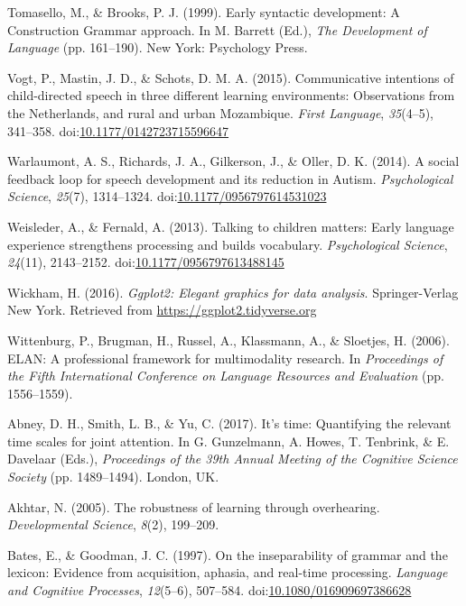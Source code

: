 \documentclass[,man,floatsintext]{apa6}
\begin{document}
\hypertarget{ref-tomasello1999early}{}
Tomasello, M., \& Brooks, P. J. (1999). Early syntactic development: A
Construction Grammar approach. In M. Barrett (Ed.), \emph{The
Development of Language} (pp. 161--190). New York: Psychology Press.

\hypertarget{ref-vogt2015communicative}{}
Vogt, P., Mastin, J. D., \& Schots, D. M. A. (2015). Communicative
intentions of child-directed speech in three different learning
environments: Observations from the Netherlands, and rural and urban
Mozambique. \emph{First Language}, \emph{35}(4--5), 341--358.
doi:\href{https://doi.org/10.1177/0142723715596647}{10.1177/0142723715596647}

\hypertarget{ref-warlaumont2014social}{}
Warlaumont, A. S., Richards, J. A., Gilkerson, J., \& Oller, D. K.
(2014). A social feedback loop for speech development and its reduction
in Autism. \emph{Psychological Science}, \emph{25}(7), 1314--1324.
doi:\href{https://doi.org/10.1177/0956797614531023}{10.1177/0956797614531023}

\hypertarget{ref-weisleder2013talking}{}
Weisleder, A., \& Fernald, A. (2013). Talking to children matters: Early
language experience strengthens processing and builds vocabulary.
\emph{Psychological Science}, \emph{24}(11), 2143--2152.
doi:\href{https://doi.org/10.1177/0956797613488145}{10.1177/0956797613488145}

\hypertarget{ref-R-ggplot2}{}
Wickham, H. (2016). \emph{Ggplot2: Elegant graphics for data analysis}.
Springer-Verlag New York. Retrieved from
\url{https://ggplot2.tidyverse.org}

\hypertarget{ref-ELAN}{}
Wittenburg, P., Brugman, H., Russel, A., Klassmann, A., \& Sloetjes, H.
(2006). ELAN: A professional framework for multimodality research. In
\emph{Proceedings of the Fifth International Conference on Language
Resources and Evaluation} (pp. 1556--1559).

\hypertarget{ref-abney2017time}{}
Abney, D. H., Smith, L. B., \& Yu, C. (2017). It's time: Quantifying the
relevant time scales for joint attention. In G. Gunzelmann, A. Howes, T.
Tenbrink, \& E. Davelaar (Eds.), \emph{Proceedings of the 39th Annual
Meeting of the Cognitive Science Society} (pp. 1489--1494). London, UK.

\hypertarget{ref-akhtar2005robustness}{}
Akhtar, N. (2005). The robustness of learning through overhearing.
\emph{Developmental Science}, \emph{8}(2), 199--209.

\hypertarget{ref-bates1997inseparability}{}
Bates, E., \& Goodman, J. C. (1997). On the inseparability of grammar
and the lexicon: Evidence from acquisition, aphasia, and real-time
processing. \emph{Language and Cognitive Processes}, \emph{12}(5--6),
507--584.
doi:\href{https://doi.org/10.1080/016909697386628}{10.1080/016909697386628}
\end{document}
